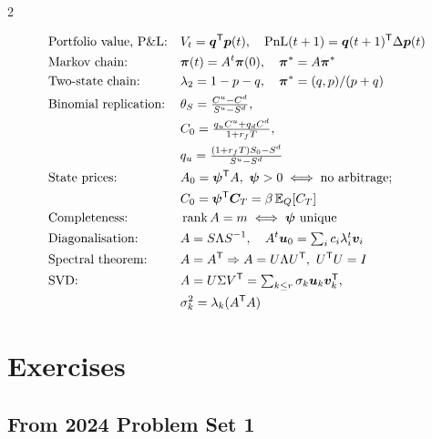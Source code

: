 \begin{paracol}{2}
\begin{keyformulas}
\begin{align*}
&\text{Portfolio value, P\&L:} && V_t=\bm q^{\mathsf T}\bm p(t),\quad \mathrm{PnL}(t+1)=\bm q(t+1)^{\mathsf T}\Delta\bm p(t)\\
&\text{Markov chain:} && \bm\pi(t)=A^t\bm\pi(0),\quad \bm\pi^*=A\bm\pi^*\\
&\text{Two-state chain:} && \lambda_2=1-p-q,\quad \bm\pi^*=(q,p)/(p+q)\\
&\text{Binomial replication:} && \theta_S=\tfrac{C^u-C^d}{S^u-S^d},\\
  &&& C_0=\tfrac{q_uC^u+q_dC^d}{1+r_fT},\\
  &&& q_u=\tfrac{(1+r_fT)S_0-S^d}{S^u-S^d}\\
&\text{State prices:} && A_0=\bm\psi^{\mathsf T} A,\ \bm\psi>0 \iff \text{no arbitrage};\\
  &&& C_0=\bm\psi^{\mathsf T}\bm C_T=\beta\,\mathbb{E}_Q[C_T]\\
&\text{Completeness:} && \operatorname{rank} A=m\iff \bm\psi\text{ unique}\\
&\text{Diagonalisation:} && A=S\Lambda S^{-1},\quad A^t\bm u_0=\textstyle\sum_ic_i\lambda_i^t\bm v_i\\
&\text{Spectral theorem:} && A=A^{\mathsf T}\Rightarrow A=U\Lambda U^{\mathsf T},\ U^{\mathsf T} U=I\\
&\text{SVD:} && A=U\Sigma V^{\mathsf T}=\textstyle\sum_{k\le r}\sigma_k\bm u_k\bm v_k^{\mathsf T},\\
  &&& \sigma_k^2=\lambda_k(A^{\mathsf T} A)
\end{align*}
\end{keyformulas}

\section*{Exercises}

\subsection*{From 2024 Problem Set 1}


\end{paracol}
